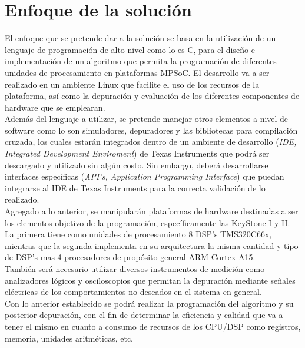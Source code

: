 

\chapter{Enfoque de la solución}
\label{ch:Enfoque_de_la_solucion}

El enfoque que se pretende dar a la solución se basa en la utilización de un lenguaje de programación
de alto nivel como lo es C, para el diseño e implementación de un algoritmo que permita la programación
de diferentes unidades de procesamiento en plataformas MPSoC. El desarrollo va a ser realizado en un ambiente
Linux que facilite el uso de los recursos de la plataforma, así como la depuración y evaluación de los diferentes
componentes de hardware que se emplearan.\\

Además del lenguaje a utilizar, se pretende manejar otros elementos a nivel de software como lo son simuladores, 
depuradores y las bibliotecas para compilación cruzada, los cuales estarán integrados dentro de un ambiente de 
desarrollo (\textit{IDE, Integrated Development Enviroment}) de Texas Instruments que podrá ser descargado y 
utilizado sin algún costo. Sin embargo, deberá desarrollarse interfaces específicas 
(\textit{API's, Application Programming Interface}) que puedan integrarse al IDE de Texas Instruments para 
la correcta validación de lo realizado.\\

Agregado a lo anterior, se manipularán plataformas de hardware destinadas a ser los elementos objetivo de la
programación, específicamente las KeyStone I y II. La primera tiene como unidades de procesamiento 8 DSP's 
TMS320C66x, mientras que la segunda implementa en su arquitectura la misma cantidad y tipo de DSP's
mas 4 procesadores de propósito general ARM Cortex-A15.\\

También será necesario utilizar diversos instrumentos de medición como analizadores lógicos y osciloscopios
que permitan la depuración mediante señales eléctricas de los comportamientos no deseados en el sistema en general.\\

Con lo anterior establecido se podrá realizar la programación del algoritmo y su posterior depuración, con el fin de
determinar la eficiencia y calidad que va a tener el mismo en cuanto a consumo de recursos de los CPU/DSP como registros,
memoria, unidades aritméticas, etc.